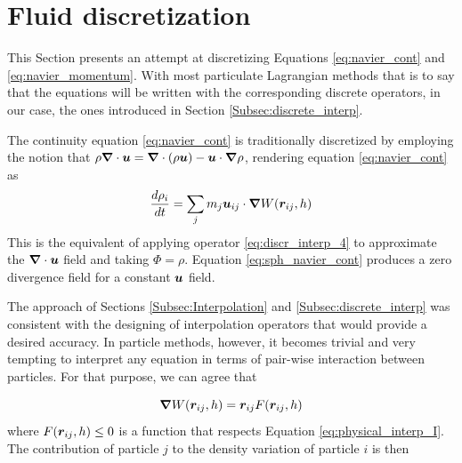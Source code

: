 \newpage
\section{Fluid discretization}
\label{sec:fluid-discretization}

This Section presents an attempt at discretizing Equations \eqref{eq:navier_cont} and \eqref{eq:navier_momentum}. With most particulate Lagrangian methods that is to say that the equations will be written with the corresponding discrete operators, in our case, the ones introduced in Section \ref{Subsec:discrete_interp}.

The continuity equation \eqref{eq:navier_cont} is traditionally discretized by employing the notion that $\rho \boldsymbol{\nabla} \cdot \boldsymbol{u} = \boldsymbol{\nabla} \cdot( \rho \boldsymbol{u}) - \boldsymbol{u} \cdot\boldsymbol{\nabla} \rho$, rendering equation \eqref{eq:navier_cont} as 
%
\begin{equation} \label{eq:sph_navier_cont}
	\frac{{d\rho_i }}{{dt}} = \sum_j{{m_j} \boldsymbol{u}_{ij} \cdot \boldsymbol{\nabla} W(\boldsymbol{r}_{ij}, h)}
\end{equation}
%
This is the equivalent of applying operator \eqref{eq:discr_interp_4} to approximate the $\boldsymbol{\nabla} \cdot \boldsymbol{u} $ field and taking $\Phi=\rho$. Equation \eqref{eq:sph_navier_cont} produces a zero divergence field for a constant $\boldsymbol{u}$ field. 

The approach of Sections \ref{Subsec:Interpolation} and \ref{Subsec:discrete_interp} was consistent with the designing of interpolation operators that would provide a desired accuracy. In particle methods, however, it becomes trivial and very tempting to interpret any equation in terms of pair-wise interaction between particles. For that purpose, we can agree that 

%
\begin{equation} \label{eq:physical_interp_I}
	\boldsymbol{\nabla} W(\boldsymbol{r}_{ij}, h) = \boldsymbol{r}_{ij}F(\boldsymbol{r}_{ij}, h)
\end{equation}
%
where $F(\boldsymbol{r}_{ij}, h) \leq 0$ is a function that respects Equation \eqref{eq:physical_interp_I}. The contribution of particle $j$ to the density variation of particle $i$ is then

